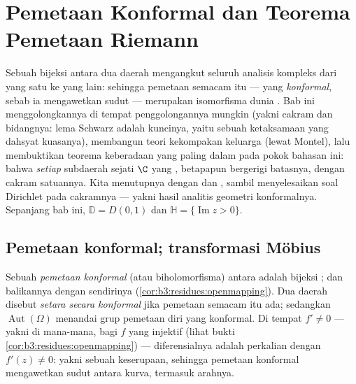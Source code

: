 \chapter{Pemetaan Konformal dan Teorema Pemetaan Riemann}
\label{ch:b3:conformal}

Sebuah bijeksi  antara dua daerah mengangkut seluruh
analisis kompleks dari yang satu ke yang lain: sehingga pemetaan semacam itu ---
yang \emph{konformal}, sebab ia mengawetkan sudut --- merupakan
isomorfisma dunia . Bab ini menggolongkannya
di tempat penggolongannya mungkin (yakni cakram dan bidangnya:
lema Schwarz adalah kuncinya, yaitu sebuah ketaksamaan yang dahsyat
kuasanya), membangun teori kekompakan keluarga 
(lewat Montel), lalu membuktikan teorema keberadaan yang paling dalam pada
pokok bahasan ini: bahwa \emph{setiap} subdaerah sejati $\C$ yang , betapapun bergerigi batasnya, 
dengan cakram satuannya. Kita menutupnya dengan  dan
, sambil menyelesaikan soal Dirichlet pada cakramnya ---
yakni hasil analitis geometri konformalnya. Sepanjang bab ini,
$\mathbb D = D(0,1)$ dan $\mathbb H = \{\operatorname{Im}z >
0\}$.

\section{Pemetaan konformal; transformasi Möbius}

\begin{definition}\label{def:b3:conformal:conformal}
Sebuah \emph{pemetaan konformal} (atau
biholomorfisma) antara  adalah bijeksi ;
dan balikannya dengan sendirinya 
(\cref{cor:b3:residues:openmapping}). Dua daerah disebut
\emph{setara secara konformal} jika pemetaan semacam itu ada; sedangkan
$\operatorname{Aut}(\Omega)$ menandai grup pemetaan diri
yang konformal. Di tempat $f' \neq 0$ --- yakni di mana-mana, bagi $f$ yang injektif
(lihat bukti \cref{cor:b3:residues:openmapping}) ---
diferensialnya adalah perkalian dengan $f'(z) \neq 0$: yakni sebuah
keserupaan, sehingga pemetaan konformal mengawetkan sudut antara kurva,
termasuk arahnya.
\end{definition}

